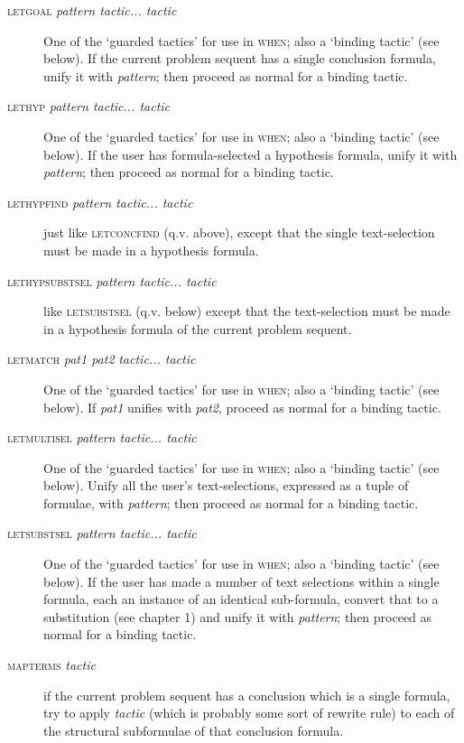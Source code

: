 \begin{description}
\item [\textsc{letgoal} \textit{pattern tactic... tactic}] One of the `guarded tactics' for use in \textsc{when}; also a `binding tactic' (see below). If the current problem sequent has a single conclusion formula, unify it with \textit{pattern}; then proceed as normal for a binding tactic.

\item [\textsc{lethyp} \textit{pattern tactic... tactic}] One of the `guarded tactics' for use in \textsc{when}; also a `binding tactic' (see below). If the user has formula-selected a hypothesis formula, unify it with \textit{pattern}; then proceed as normal for a binding tactic.


\item [\textsc{lethypfind} \textit{pattern tactic... tactic}] just like \textsc{letconcfind} (q.v. above), except that the single text-selection must be made in a hypothesis formula.

\item [\textsc{lethypsubstsel} \textit{pattern tactic... tactic}] like \textsc{letsubstsel} (q.v. below) except that the text-selection must be made in a hypothesis formula of the current problem sequent.

\item [\textsc{letmatch} \textit{pat1 pat2} \textit{tactic... tactic}] One of the `guarded tactics' for use in \textsc{when}; also a `binding tactic' (see below). If \textit{pat1} unifies with \textit{pat2}, proceed as normal for a binding tactic.


\item [\textsc{letmultisel} \textit{pattern tactic... tactic}] One of the `guarded tactics' for use in \textsc{when}; also a `binding tactic' (see below). Unify all the user's text-selections, expressed as a tuple of formulae, with \textit{pattern}; then proceed as normal for a binding tactic.


\item [\textsc{letsubstsel} \textit{pattern tactic... tactic}] One of the `guarded tactics' for use in \textsc{when}; also a `binding tactic' (see below). If the user has made a number of text selections within a single formula, each an instance of an identical sub-formula, convert that to a substitution (see chapter 1) and unify it with \textit{pattern}; then proceed as normal for a binding tactic.


\item [\textsc{mapterms} \textit{tactic}] if the current problem sequent has a conclusion which is a single formula, try to apply \textit{tactic} (which is probably some sort of rewrite rule) to each of the structural subformulae of that conclusion formula.


\end{description}
